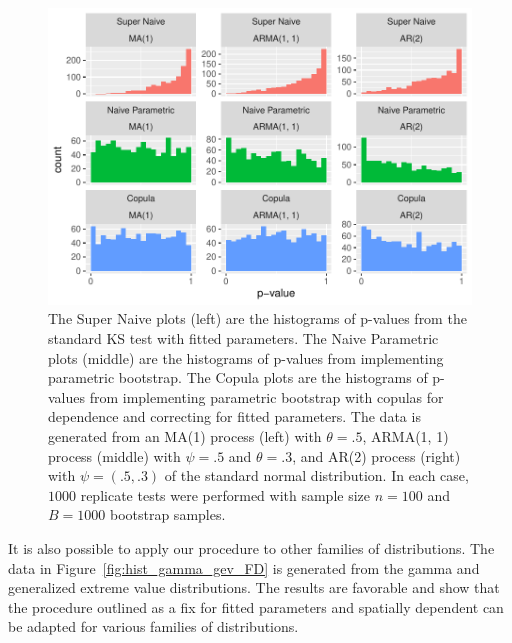 \documentclass[12pt, letterpaper, titlepage]{article}
\begin{document}
\begin{figure}[tbp]
  \centering
  \includegraphics{hist_ma1_arma_ar2_FD}
  \caption{The Super Naive plots (left) are the histograms of p-values from the 
  standard KS test with fitted parameters. The Naive Parametric plots (middle) 
  are the histograms of p-values from implementing parametric bootstrap. The 
  Copula plots are the histograms of p-values from implementing parametric 
  bootstrap with copulas for dependence and correcting for fitted parameters. 
  The data is generated from an MA(1) process (left) with $\theta = .5$, ARMA(1,
  1) process (middle) with $\psi = .5$ and $\theta = .3$, and AR(2) process 
  (right) with $\psi = (.5, .3)$ of the standard normal distribution. In each 
  case, $1000$ replicate tests were performed with sample size $n = 100$ and 
  $B = 1000$ bootstrap samples.}
  \label{fig:hist_ma1_arma_ar2_FD}
\end{figure}

It is also possible to apply our procedure to other families of distributions. 
The data in Figure~\ref{fig:hist_gamma_gev_FD} is generated from the gamma and 
generalized extreme value distributions. The results are favorable and show that 
the procedure outlined as a fix for fitted parameters and spatially dependent 
can be adapted for various families of distributions.
\end{document}
